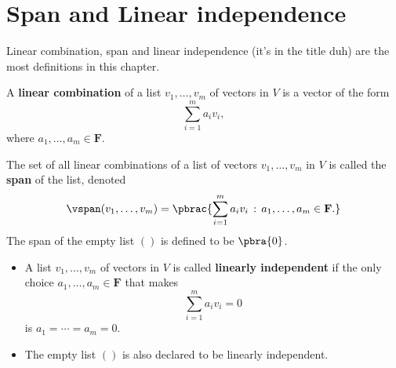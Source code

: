 \section{Span and Linear independence}

Linear combination, span and linear independence (it's in the title duh) are the most definitions in this chapter.

\begin{definition}
  A \textbf{linear combination} of a list $v_1, \dots, v_m$ of vectors in $V$ is a vector of the form
  \begin{equation*}
    \sum_{i=1}^m a_iv_i,
  \end{equation*}
  where $a_1, \dots, a_m \in \mathbf{F}$.
\end{definition}

\begin{definition}
  The set of all linear combinations of a list of vectors $v_1, \dots, v_m$ in $V$ is called the \textbf{span} of the list, denoted
  \begin{equation*}
    \vspan(v_1, \dots, v_m) = \pbrac{
      \sum_{i=1}^m a_iv_i \, :\, a_1, \dots, a_m \in \mathbf{F}.
    }
  \end{equation*}
  The span of the empty list $()$ is defined to be $\pbra{0}$.
\end{definition}

\begin{definition}
  \begin{itemize}
    \item A list $v_1, \dots, v_m$ of vectors in $V$ is called \textbf{linearly independent} if the only choice $a_1, \dots, a_m \in \mathbf{F}$ that makes
          \begin{equation*}
            \sum_{i=1}^m a_iv_i = 0
          \end{equation*}
          is $a_1 = \cdots = a_m = 0$.
    \item The empty list $()$ is also declared to be linearly independent.
  \end{itemize}
\end{definition}


